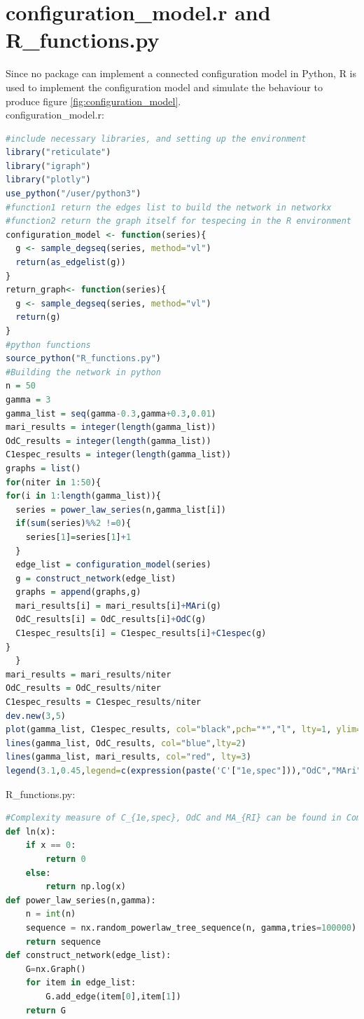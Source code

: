 \documentclass[12pt]{article}
\begin{document}
\section{configuration\_model.r and R\_functions.py}
Since no package can implement a connected configuration model in Python, R is used to implement the configuration model and simulate the behaviour to produce figure \ref{fig:configuration_model}.
\\
configuration\_model.r:
\begin{lstlisting}[breaklines=true,language=R]
#include necessary libraries, and setting up the environment
library("reticulate")
library("igraph")
library("plotly")
use_python("/user/python3")
#function1 return the edges list to build the network in networkx
#function2 return the graph itself for tespecing in the R environment
configuration_model <- function(series){
  g <- sample_degseq(series, method="vl")
  return(as_edgelist(g))
}
return_graph<- function(series){
  g <- sample_degseq(series, method="vl")
  return(g)
}
#python functions
source_python("R_functions.py")
#Building the network in python
n = 50
gamma = 3
gamma_list = seq(gamma-0.3,gamma+0.3,0.01)
mari_results = integer(length(gamma_list))
OdC_results = integer(length(gamma_list))
C1espec_results = integer(length(gamma_list))
graphs = list()
for(niter in 1:50){
for(i in 1:length(gamma_list)){
  series = power_law_series(n,gamma_list[i])
  if(sum(series)%%2 !=0){
    series[1]=series[1]+1
  }
  edge_list = configuration_model(series)
  g = construct_network(edge_list)
  graphs = append(graphs,g)
  mari_results[i] = mari_results[i]+MAri(g)
  OdC_results[i] = OdC_results[i]+OdC(g)
  C1espec_results[i] = C1espec_results[i]+C1espec(g)
}
  }
mari_results = mari_results/niter
OdC_results = OdC_results/niter
C1espec_results = C1espec_results/niter
dev.new(3,5)
plot(gamma_list, C1espec_results, col="black",pch="*","l", lty=1, ylim=c(0,0.5), ylab="Complexity",xlab="Gamma" )
lines(gamma_list, OdC_results, col="blue",lty=2)
lines(gamma_list, mari_results, col="red", lty=3)
legend(3.1,0.45,legend=c(expression(paste('C'["1e,spec"])),"OdC","MAri"),col=c("black","blue","red"),lty=c(1,2,3), ncol=1)
\end{lstlisting}
\noindent
\newline
R\_functions.py:
\begin{lstlisting}[breaklines=true,language=Python]
#Complexity measure of C_{1e,spec}, OdC and MA_{RI} can be found in Complexity.py, please copy and paste them here.
def ln(x):
    if x == 0:
        return 0
    else:
        return np.log(x)
def power_law_series(n,gamma):
    n = int(n)
    sequence = nx.random_powerlaw_tree_sequence(n, gamma,tries=100000)
    return sequence
def construct_network(edge_list):
    G=nx.Graph()
    for item in edge_list:
        G.add_edge(item[0],item[1])
    return G 
\end{lstlisting}

\printbibliography[heading=bibnumbered]
\end{document}
